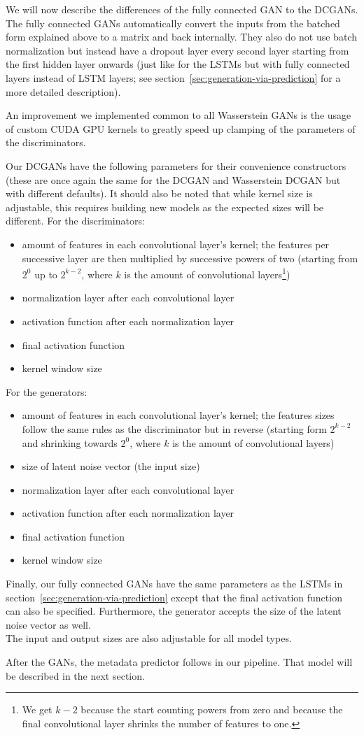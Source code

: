 We will now describe the differences of the fully connected GAN to the
DCGANs. The fully connected GANs automatically convert the inputs from
the batched form explained above to a matrix and back internally. They
also do not use batch normalization but instead have a dropout layer
every second layer starting from the first hidden layer onwards (just
like for the LSTMs but with fully connected layers instead of LSTM
layers; see section~\ref{sec:generation-via-prediction} for a more
detailed description).

An improvement we implemented common to all Wasserstein GANs is the
usage of custom CUDA GPU kernels to greatly speed up clamping of the
parameters of the discriminators.

Our DCGANs have the following parameters for their convenience
constructors (these are once again the same for the DCGAN and
Wasserstein DCGAN but with different defaults). It should also be
noted that while kernel size is adjustable, this requires building new
models as the expected sizes will be different. For the discriminators:
\begin{itemize}
\item amount of features in each convolutional layer's kernel; the
  features per successive layer are then multiplied by successive
  powers of two (starting from $2^{0}$ up to $2^{k - 2}$, where $k$ is
  the amount of convolutional layers\footnote{We get $k - 2$ because
    the start counting powers from zero and because the final
    convolutional layer shrinks the number of features to one.})
\item normalization layer after each convolutional layer
\item activation function after each normalization layer
\item final activation function
\item kernel window size
\end{itemize}
For the generators:
\begin{itemize}
\item amount of features in each convolutional layer's kernel; the
  features sizes follow the same rules as the discriminator but in
  reverse (starting form $2^{k - 2}$ and shrinking towards $2^{0}$,
  where $k$ is the amount of convolutional layers)
\item size of latent noise vector (the input size)
\item normalization layer after each convolutional layer
\item activation function after each normalization layer
\item final activation function
\item kernel window size
\end{itemize}
Finally, our fully connected GANs have the same parameters as the
LSTMs in section~\ref{sec:generation-via-prediction} except that the
final activation function can also be specified. Furthermore, the
generator accepts the size of the latent noise vector as well. \\
The input and output sizes are also adjustable for all model types.

After the GANs, the metadata predictor follows in our pipeline. That
model will be described in the next section.


